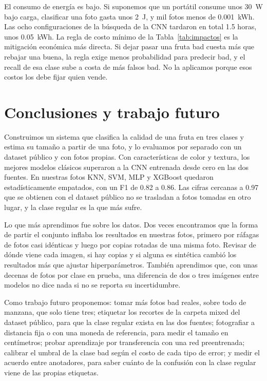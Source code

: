 \documentclass[conference]{IEEEtran}
\begin{document}
El consumo de energía es bajo. Si suponemos que un portátil consume unos 30~W bajo carga, clasificar una foto gasta unos 2~J, y mil fotos menos de 0.001~kWh. Las ocho configuraciones de la búsqueda de la CNN tardaron en total 1.5 horas, unos 0.05~kWh. La regla de costo mínimo de la Tabla~\ref{tab:impactos} es la mitigación económica más directa. Si dejar pasar una fruta bad cuesta más que rebajar una buena, la regla exige menos probabilidad para predecir bad, y el recall de esa clase sube a costa de más falsos bad. No la aplicamos porque esos costos los debe fijar quien vende.

\section{Conclusiones y trabajo futuro}

Construimos un sistema que clasifica la calidad de una fruta en tres clases y estima su tamaño a partir de una foto, y lo evaluamos por separado con un dataset público y con fotos propias. Con características de color y textura, los mejores modelos clásicos superaron a la CNN entrenada desde cero en las dos fuentes. En nuestras fotos KNN, SVM, MLP y XGBoost quedaron estadísticamente empatados, con un F1 de 0.82 a 0.86. Las cifras cercanas a 0.97 que se obtienen con el dataset público no se trasladan a fotos tomadas en otro lugar, y la clase regular es la que más sufre.

Lo que más aprendimos fue sobre los datos. Dos veces encontramos que la forma de partir el conjunto inflaba los resultados en nuestras fotos, primero por ráfagas de fotos casi idénticas y luego por copias rotadas de una misma foto. Revisar de dónde viene cada imagen, si hay copias y si alguna es sintética cambió los resultados más que ajustar hiperparámetros. También aprendimos que, con unas decenas de fotos por clase en prueba, una diferencia de dos o tres imágenes entre modelos no dice nada si no se reporta su incertidumbre.

Como trabajo futuro proponemos: tomar más fotos bad reales, sobre todo de manzana, que solo tiene tres; etiquetar los recortes de la carpeta mixed del dataset público, para que la clase regular exista en las dos fuentes; fotografiar a distancia fija o con una moneda de referencia, para medir el tamaño en centímetros; probar aprendizaje por transferencia con una red preentrenada; calibrar el umbral de la clase bad según el costo de cada tipo de error; y medir el acuerdo entre anotadores, para saber cuánto de la confusión con la clase regular viene de las propias etiquetas.
\end{document}
